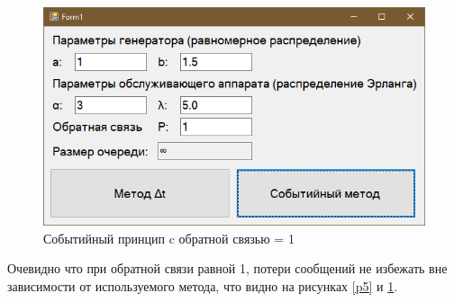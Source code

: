 \begin{figure}[!h]
	\includegraphics[width=1\linewidth]{inc/img/6.png}
	\caption{Событийный принцип c обратной связью = 1}
	\label{p6}
\end{figure}

Очевидно что при обратной связи равной 1, потери сообщений не избежать вне зависимости от используемого метода, что видно на рисунках \ref{p5} и \ref{p6}.